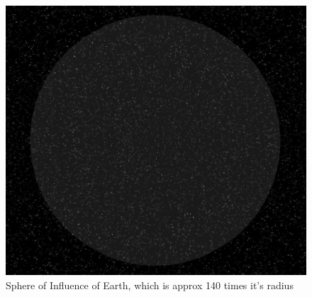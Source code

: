 \begin{figure}[H]
\includegraphics[scale=0.25]{images/soi.jpg}
\caption{Sphere of Influence of Earth, which is approx 140 times it's radius}
\end{figure}

